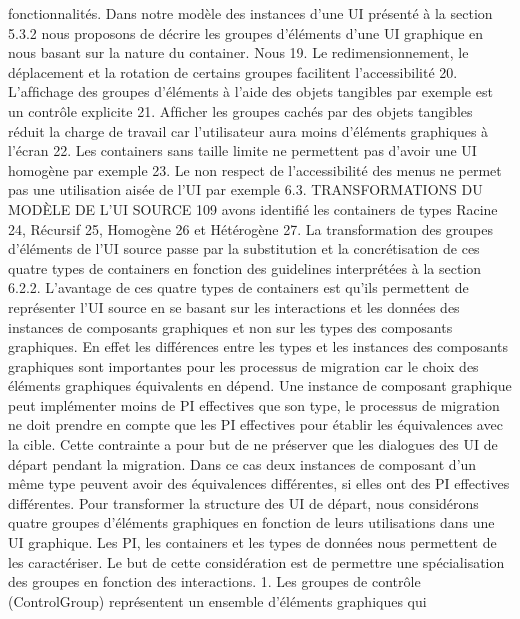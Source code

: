 \documentclass{article}
\begin{document}
fonctionnalit\'{e}s. Dans notre mod\`{e}le des instances d’une UI pr\'{e}sent\'{e} \`{a} la section 5.3.2 nous proposons
de d\'{e}crire les groupes d’\'{e}l\'{e}ments d’une UI graphique en nous basant sur la nature du container. Nous
19. Le redimensionnement, le d\'{e}placement et la rotation de certains groupes facilitent l’accessibilit\'{e}
20. L’afﬁchage des groupes d’\'{e}l\'{e}ments \`{a} l’aide des objets tangibles par exemple est un contr\^{o}le explicite
21. Afﬁcher les groupes cach\'{e}s par des objets tangibles r\'{e}duit la charge de travail car l’utilisateur aura moins d’\'{e}l\'{e}ments
graphiques \`{a} l’\'{e}cran
22. Les containers sans taille limite ne permettent pas d’avoir une UI homog\`{e}ne par exemple
23. Le non respect de l’accessibilit\'{e} des menus ne permet pas une utilisation ais\'{e}e de l’UI par exemple
6.3. TRANSFORMATIONS DU MODÈLE DE L’UI SOURCE
109
avons identiﬁ\'{e} les containers de types Racine 24, R\'{e}cursif 25, Homog\`{e}ne 26 et H\'{e}t\'{e}rog\`{e}ne 27.
La transformation des groupes d’\'{e}l\'{e}ments de l’UI source passe par la substitution et la concr\'{e}tisation de ces quatre types de containers en fonction des guidelines interpr\'{e}t\'{e}es \`{a} la section 6.2.2.
L’avantage de ces quatre types de containers est qu’ils permettent de repr\'{e}senter l’UI source en se
basant sur les interactions et les donn\'{e}es des instances de composants graphiques et non sur les types
des composants graphiques. En effet les diff\'{e}rences entre les types et les instances des composants
graphiques sont importantes pour les processus de migration car le choix des \'{e}l\'{e}ments graphiques
\'{e}quivalents en d\'{e}pend. Une instance de composant graphique peut impl\'{e}menter moins de PI effectives que son type, le processus de migration ne doit prendre en compte que les PI effectives pour
\'{e}tablir les \'{e}quivalences avec la cible. Cette contrainte a pour but de ne pr\'{e}server que les dialogues des
UI de d\'{e}part pendant la migration. Dans ce cas deux instances de composant d’un m\^{e}me type peuvent
avoir des \'{e}quivalences diff\'{e}rentes, si elles ont des PI effectives diff\'{e}rentes.
Pour transformer la structure des UI de d\'{e}part, nous consid\'{e}rons quatre groupes d’\'{e}l\'{e}ments graphiques en fonction de leurs utilisations dans une UI graphique. Les PI, les containers et les types
de donn\'{e}es nous permettent de les caract\'{e}riser. Le but de cette consid\'{e}ration est de permettre une
sp\'{e}cialisation des groupes en fonction des interactions.
1. Les groupes de contr\^{o}le (ControlGroup) repr\'{e}sentent un ensemble d’\'{e}l\'{e}ments graphiques qui
\end{document}
